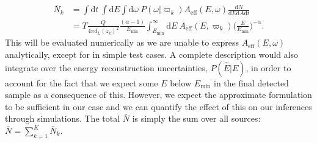 \documentclass[fontsize=12pt]{article}
\begin{document}
\begin{equation}
\begin{split}
\bar{N}_k & = \int \mathrm{d}t \ \int \mathrm{d}E \int \mathrm{d}\omega \ P(\omega | \varpi_k) A_\mathrm{eff}(E, \omega)\frac{\mathrm{d}N}{\mathrm{d}E\mathrm{d}A\mathrm{d}t} \\
& = T\frac{Q}{4 \pi d_L(z_k)^2} \frac{(\alpha -1)}{E_\mathrm{min}} \int_{E _\mathrm{min}}^{\infty} \mathrm{d}E \ A_\mathrm{eff}(E, \varpi_k) \Bigg( \frac{E}{E_\mathrm{min}} \Bigg)^{-\alpha}.
\end{split}
\end{equation}
This will be evaluated numerically as we are unable to express $A_\mathrm{eff}(E, \omega)$ analytically, except for in simple test cases. A complete description would also integrate over the energy reconstruction uncertainties, $P(\hat{E} | E)$, in order to account for the fact that we expect some $E$ below $E_\mathrm{min}$ in the final detected sample as a consequence of this. However, we expect the approximate formulation to be sufficient in our case and we can quantify the effect of this on our inferences through simulations. The total $\bar{N}$ is simply the sum over all sources: $\bar{N} = \sum_{k=1}^K \bar{N}_k$.



\end{document}
